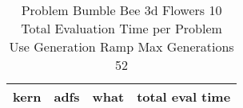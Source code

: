 \begin{table}[H]
\caption{Problem  Bumble Bee 3d  Flowers 10\\Total Evaluation Time per Problem \\ Use Generation Ramp  Max Generations 52\\}
\begin{center}
\scalebox{1.0} %
{
\begin{tabular}{lllr}
\hline
kern & adfs & what & total eval time \\
\hline


\end{tabular}
}
\end{center}
\end{table}

